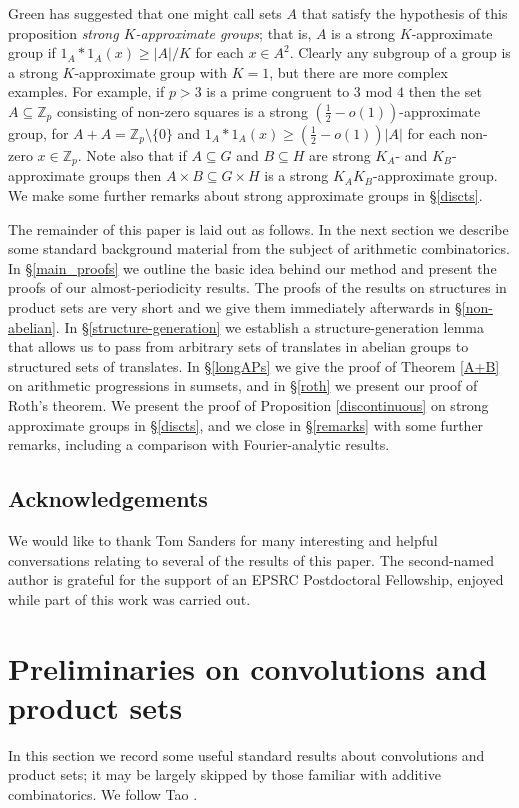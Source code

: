 \documentclass[12pt,a4paper,reqno]{amsart}
\numberwithin{equation}{section}
\theoremstyle{plain}
\theoremstyle{definition}
\renewcommand{\geq}{\geqslant}
\renewcommand{\subset}{\subseteq}
\def\Z{\mathbb{Z}}
\newcommand{\Zmod}[1]{\Z_#1} %
\begin{document}
Green \cite{green:luczak-schoen} has suggested that one might call sets $A$ that satisfy the hypothesis of this proposition \emph{strong $K$-approximate groups}; that is, $A$ is a strong $K$-approximate group if $1_A*1_A(x) \geq |A|/K$ for each $x \in A^2$. Clearly any subgroup of a group is a strong $K$-approximate group with $K=1$, but there are more complex examples. For example, if $p > 3$ is a prime congruent to $3$ mod $4$ then the set $A \subset \Zmod{p}$ consisting of non-zero squares is a strong $(\frac{1}{2} - o(1))$-approximate group, for $A+A = \Zmod{p}\setminus \{0\}$ and $1_A*1_A(x) \geq (\frac{1}{2} - o(1))|A|$ for each non-zero $x \in \Zmod{p}$. Note also that if $A \subset G$ and $B \subset H$ are strong $K_A$- and $K_B$-approximate groups then $A \times B \subset G \times H$ is a strong $K_A K_B$-approximate group. We make some further remarks about strong approximate groups in \S\ref{discts}.


The remainder of this paper is laid out as follows. In the next section we describe some standard background material from the subject of arithmetic combinatorics. In \S\ref{main_proofs} we outline the basic idea behind our method and present the proofs of our almost-periodicity results. The proofs of the results on structures in product sets are very short and we give them immediately afterwards in \S\ref{non-abelian}. In \S\ref{structure-generation} we establish a structure-generation lemma that allows us to pass from arbitrary sets of translates in abelian groups to structured sets of translates. In \S\ref{longAPs} we give the proof of Theorem \ref{A+B} on arithmetic progressions in sumsets, and in \S\ref{roth} we present our proof of Roth's theorem. We present the proof of Proposition \ref{discontinuous} on strong approximate groups in \S\ref{discts}, and we close in \S\ref{remarks} with some further remarks, including a comparison with Fourier-analytic results.

\subsection{Acknowledgements}
We would like to thank Tom Sanders for many interesting and helpful conversations relating to several of the results of this paper. The second-named author is grateful for the support of an EPSRC Postdoctoral Fellowship, enjoyed while part of this work was carried out.

\section{Preliminaries on convolutions and product sets}\label{prelims}
In this section we record some useful standard results about convolutions and product sets; it may be largely skipped by those familiar with additive combinatorics. We follow Tao \cite{tao:non-comm}.
\end{document}
